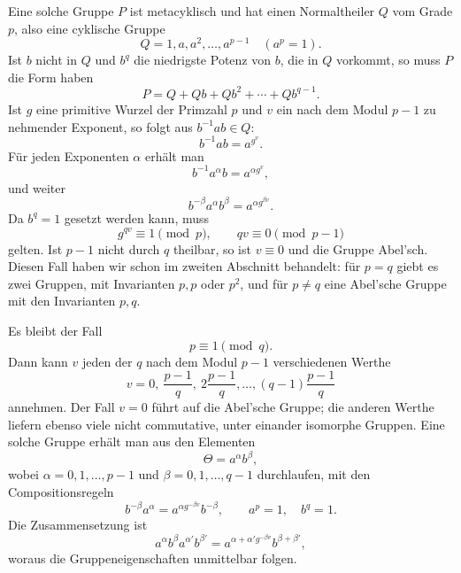 \documentclass[11pt]{article}
\begin{document}
Eine solche Gruppe $P$ ist metacyklisch und hat einen Normaltheiler $Q$ vom Grade $p$, also eine cyklische Gruppe
\begin{equation}
Q=1,a,a^2,\ldots,a^{p-1}\quad (a^p=1).
\tag{1}
\end{equation}
Ist $b$ nicht in $Q$ und $b^q$ die niedrigste Potenz von $b$, die in $Q$ vorkommt, so muss $P$ die Form haben
\begin{equation}
P=Q+Qb+Qb^2+\cdots+Qb^{q-1}.
\tag{2}
\end{equation}
Ist $g$ eine primitive Wurzel der Primzahl $p$ und $v$ ein nach dem Modul $p-1$ zu nehmender Exponent, so folgt aus $b^{-1}ab\in Q$:
\begin{equation}
b^{-1}ab=a^{g^v}.
\tag{3}
\end{equation}
Für jeden Exponenten $\alpha$ erhält man
\begin{equation}
b^{-1}a^\alpha b=a^{\alpha g^v},
\tag{4}
\end{equation}
und weiter
\begin{equation}
b^{-\beta}a^\alpha b^\beta=a^{\alpha g^{\beta v}}.
\tag{5}
\end{equation}
Da $b^q=1$ gesetzt werden kann, muss
\begin{equation}
g^{qv}\equiv1\pmod p,
\qquad qv\equiv0\pmod {p-1}
\tag{6}
\end{equation}
gelten. Ist $p-1$ nicht durch $q$ theilbar, so ist $v\equiv0$ und die Gruppe Abel'sch. Diesen Fall haben wir schon im zweiten Abschnitt behandelt: für $p=q$ giebt es zwei Gruppen, mit Invarianten $p,p$ oder $p^2$, und für $p\ne q$ eine Abel'sche Gruppe mit den Invarianten $p,q$.

Es bleibt der Fall
\[
p\equiv1\pmod q.
\]
Dann kann $v$ jeden der $q$ nach dem Modul $p-1$ verschiedenen Werthe
\begin{equation}
v=0,\ \frac{p-1}{q},\ 2\frac{p-1}{q},\ldots,(q-1)\frac{p-1}{q}
\tag{7}
\end{equation}
annehmen. Der Fall $v=0$ führt auf die Abel'sche Gruppe; die anderen Werthe liefern ebenso viele nicht commutative, unter einander isomorphe Gruppen. Eine solche Gruppe erhält man aus den Elementen
\begin{equation}
\Theta=a^\alpha b^\beta,
\tag{8}
\end{equation}
wobei $\alpha=0,1,\ldots,p-1$ und $\beta=0,1,\ldots,q-1$ durchlaufen, mit den Compositionsregeln
\begin{equation}
b^{-\beta}a^\alpha=a^{\alpha g^{-\beta v}}b^{-\beta},\qquad a^p=1,
\quad b^q=1.
\tag{9}
\end{equation}
Die Zusammensetzung ist
\begin{equation}
a^\alpha b^\beta a^{\alpha'}b^{\beta'}=a^{\alpha+\alpha'g^{-\beta v}}b^{\beta+\beta'},
\tag{10}
\end{equation}
woraus die Gruppeneigenschaften unmittelbar folgen.
\end{document}

